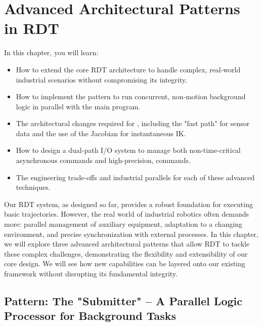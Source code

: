 
\chapter{Advanced Architectural Patterns in RDT}
\label{chap:advanced_patterns}

\begin{navigationbox}{In this chapter, you will learn:}
    \begin{itemize}
        \item How to extend the core RDT architecture to handle complex, real-world industrial scenarios without compromising its integrity.
        \item How to implement the  pattern to run concurrent, non-motion background logic in parallel with the main program.
        \item The architectural changes required for , including the "fast path" for sensor data and the use of the Jacobian for instantaneous IK.
        \item How to design a dual-path I/O system to manage both non-time-critical asynchronous commands and high-precision,  commands.
        \item The engineering trade-offs and industrial parallels for each of these advanced techniques.
    \end{itemize}
\end{navigationbox}

Our RDT system, as designed so far, provides a robust foundation for executing basic trajectories. However, the real world of industrial robotics often demands more: parallel management of auxiliary equipment, adaptation to a changing environment, and precise synchronization with external processes. In this chapter, we will explore three advanced architectural patterns that allow RDT to tackle these complex challenges, demonstrating the flexibility and extensibility of our core design. We will see how new capabilities can be layered onto our existing framework without disrupting its fundamental integrity.

\section{Pattern: The "Submitter" – A Parallel Logic Processor for Background Tasks}
\label{sec:pattern_submitter}

